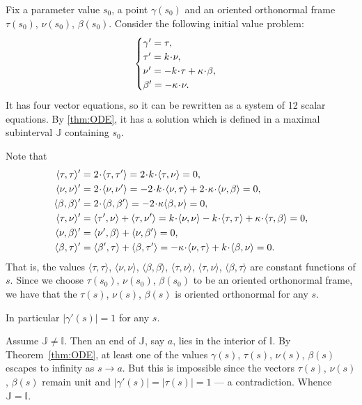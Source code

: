 Fix a parameter value $s_0$, a point $\gamma(s_0)$ and an oriented orthonormal frame $\tau(s_0)$, $\nu(s_0)$, $\beta(s_0)$.
Consider the following initial value problem: 
\[
\begin{cases}
\gamma'=\tau,
\\
\tau'=\kur\cdot\nu,
\\
\nu'=-\kur\cdot\tau+\tor\cdot\beta,
\\
\beta'=-\tor\cdot\nu.
\end{cases}
\]
It has four vector equations, so it can be rewritten as a system of 12 scalar equations.
By \ref{thm:ODE}, it has a solution which is defined in a maximal subinterval $\mathbb{J}$ containing $s_0$.

Note that 
\begin{align*}
\langle\tau,\tau\rangle'
&=
2\cdot\langle\tau,\tau'\rangle
=
2\cdot\kur\cdot \langle\tau,\nu\rangle
=
0,
\\
\langle\nu,\nu\rangle'
&=
2\cdot\langle\nu,\nu'\rangle
=
-
2\cdot\kur\cdot\langle\nu,\tau\rangle
+
2\cdot\tor\cdot\langle\nu,\beta\rangle
=
0,
\\
\langle\beta,\beta\rangle'
&=
2\cdot\langle\beta,\beta'\rangle
=
-2\cdot\tor\langle\beta,\nu\rangle
=
0,
\\
\langle\tau,\nu\rangle'
&=
\langle\tau',\nu\rangle
+
\langle\tau,\nu'\rangle
=
\kur\cdot\langle\nu,\nu\rangle
-
\kur\cdot\langle\tau,\tau\rangle
+
\tor\cdot\langle\tau,\beta\rangle
=
0,
\\
\langle\nu,\beta\rangle'
&=
\langle\nu',\beta\rangle+\langle\nu,\beta'\rangle
=0,
\\
\langle\beta,\tau\rangle'
&=
\langle\beta',\tau\rangle+\langle\beta,\tau'\rangle
=
-\tor\cdot \langle\nu,\tau\rangle
+\kur\cdot\langle\beta,\nu\rangle
=0.
\end{align*}
That is, the values 
$\langle\tau,\tau\rangle$,
$\langle\nu,\nu\rangle$,
$\langle\beta,\beta\rangle$,
$\langle\tau,\nu\rangle$,
$\langle\tau,\nu\rangle$,
$\langle\beta,\tau\rangle$
are constant functions of $s$.
Since we choose $\tau(s_0)$, $\nu(s_0)$, $\beta(s_0)$ to be an oriented orthonormal frame, we have that the $\tau(s)$, $\nu(s)$, $\beta(s)$ is oriented orthonormal for any $s$.

In particular $|\gamma'(s)|=1$ for any $s$.

Assume $\mathbb{J}\ne \mathbb{I}$.
Then an end of $\mathbb{J}$, say $a$, lies in the interior of $\mathbb{I}$.
By Theorem~\ref{thm:ODE}, at least one of the values $\gamma(s)$, $\tau(s)$, $\nu(s)$, $\beta(s)$
escapes to infinity as $s\to a$.
But this is impossible since the vectors $\tau(s)$, $\nu(s)$, $\beta(s)$ remain unit and $|\gamma'(s)|=|\tau(s)|=1$ --- a contradiction.
Whence $\mathbb{J}= \mathbb{I}$.

